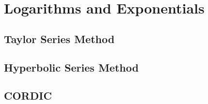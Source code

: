 \section{Logarithms and Exponentials}
\subsection{Taylor Series Method}
\subsection{Hyperbolic Series Method}
\subsection{CORDIC}
